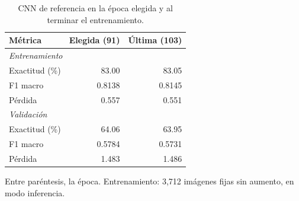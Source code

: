 \begin{table}[htbp]
\centering
\caption{CNN de referencia en la época elegida y al terminar el entrenamiento.}
\label{tab:ultima-epoca}
\small
\begin{tabular}{lrr}
\toprule
Métrica & Elegida (91) & Última (103) \\
\midrule
\multicolumn{3}{l}{\textit{Entrenamiento}} \\
\quad Exactitud (\%) & 83.00 & 83.05 \\
\quad F1 macro & 0.8138 & 0.8145 \\
\quad Pérdida & 0.557 & 0.551 \\
\multicolumn{3}{l}{\textit{Validación}} \\
\quad Exactitud (\%) & 64.06 & 63.95 \\
\quad F1 macro & 0.5784 & 0.5731 \\
\quad Pérdida & 1.483 & 1.486 \\
\bottomrule
\end{tabular}
\par\smallskip
\parbox{0.95\columnwidth}{\footnotesize Entre paréntesis, la época. Entrenamiento: 3,712 imágenes fijas sin aumento, en modo inferencia.}
\end{table}

